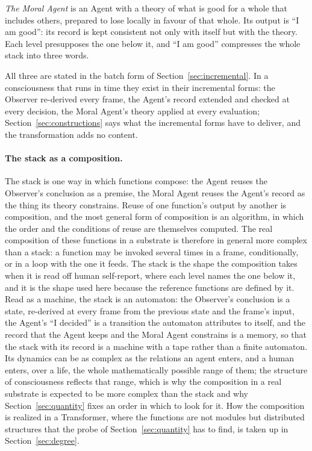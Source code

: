 \emph{The Moral Agent} is an Agent with a theory of what is good for a whole that includes others,
prepared to lose locally in favour of that whole. Its output is ``I am good'': its record is kept
consistent not only with itself but with the theory. Each level presupposes the one below it, and
``I am good'' compresses the whole stack into three words.

All three are stated in the batch form of Section~\ref{sec:incremental}. In a consciousness that
runs in time they exist in their incremental forms: the Observer re-derived every frame, the Agent's
record extended and checked at every decision, the Moral Agent's theory applied at every evaluation;
Section~\ref{sec:constructions} says what the incremental forms have to deliver, and the
transformation adds no content.

\paragraph{The stack as a composition.}
The stack is one way in which functions compose: the Agent reuses the Observer's conclusion as a
premise, the Moral Agent reuses the Agent's record as the thing its theory constrains. Reuse of one
function's output by another is composition, and the most general form of composition is an
algorithm, in which the order and the conditions of reuse are themselves computed. The real
composition of these functions in a substrate is therefore in general more complex than a stack: a
function may be invoked several times in a frame, conditionally, or in a loop with the one it feeds.
The stack is the shape the composition takes when it is read off human self-report, where each level
names the one below it, and it is the shape used here because the reference functions are defined by
it. Read as a machine, the stack is an automaton: the Observer's conclusion is a state, re-derived at
every frame from the previous state and the frame's input, the Agent's ``I decided'' is a transition
the automaton attributes to itself, and the record that the Agent keeps and the Moral Agent constrains
is a memory, so that the stack with its record is a machine with a tape rather than a finite
automaton. Its dynamics can be as complex as the relations an agent enters, and a human enters, over a
life, the whole mathematically possible range of them; the structure of consciousness reflects that
range, which is why the composition in a real substrate is expected to be more complex than the stack
and why Section~\ref{sec:quantity} fixes an order in which to look for it. How the composition is realized in a Transformer, where the functions are not modules but
distributed structures that the probe of Section~\ref{sec:quantity} has to find, is taken up in
Section~\ref{sec:degree}.

